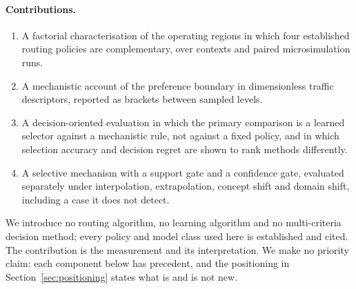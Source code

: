 \paragraph{Contributions.}
\begin{enumerate}
\item A factorial characterisation of the operating regions in which four
established routing policies are complementary, over \NumContexts{} contexts
and \NumRunsMain{} paired microsimulation runs.
\item A mechanistic account of the preference boundary in dimensionless traffic
descriptors, reported as brackets between sampled levels.
\item A decision-oriented evaluation in which the primary comparison is a
learned selector against a mechanistic rule, not against a fixed policy, and in
which selection accuracy and decision regret are shown to rank methods
differently.
\item A selective mechanism with a support gate and a confidence gate,
evaluated separately under interpolation, extrapolation, concept shift and
domain shift, including a case it does not detect.
\end{enumerate}

We introduce no routing algorithm, no learning algorithm and no multi-criteria
decision method; every policy and model class used here is established and
cited. The contribution is the measurement and its interpretation. We make no
priority claim: each component below has precedent, and the positioning in
Section~\ref{sec:positioning} states what is and is not new.
